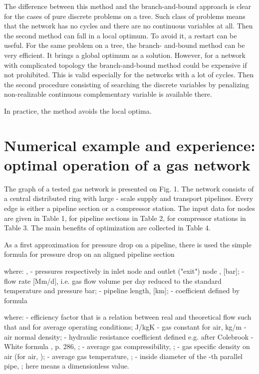 \documentclass{article}
\begin{document}
The difference between this method and the branch-and-bound approach is
clear for the cases of pure discrete problems on a tree. Such class of
problems means that the network has no cycles and there are no continuous
variables at all. Then the second method can fall in a local optimum. To
avoid it, a restart can be useful. For the same problem on a tree, the
branch- and-bound method can be very efficient. It brings a global optimum
as a solution. However, for a network with complicated topology the
branch-and-bound method could be expensive if not prohibited. This is valid
especially for the networks with a lot of cycles. Then the second procedure
consisting of searching the discrete variables  by penalizing
non-realizable continuous complementary variable  is available there.

In practice, the method avoids the local optima.

\section{Numerical example and experience: optimal operation of a gas network}

The graph of a tested gas network is presented on Fig. 1. The network
consists of a central distributed ring with large - scale supply and
transport pipelines. Every edge is either a pipeline section or a compressor
station. The input data for nodes are given in Table 1, for pipeline
sections in Table 2, for compressor stations in Table 3. The main benefits
of optimization are collected in Table 4.

As a first approximation for pressure drop on a pipeline, there is used the
simple formula for pressure drop on an aligned pipeline section

where:  ,  - pressures respectively in inlet node  and
outlet ("exit") node , [bar];  - flow rate [Mm/d], i.e. gas flow volume per day reduced to the standard temperature  and pressure  bar;  - pipeline length, [km];  -
coefficient defined by formula

where:  - efficiency factor that is a relation between real and
theoretical flow such that  and  for average operating
conditions;  J/kgK - gas constant for air,  kg/m
- air normal density;  - hydraulic resistance coefficient defined
e.g. after Colebrook - White formula \cite{11 Simone-88}, p. 286, ;  - average gas compressibility, ;  - gas
specific density on air (for air, );  - average gas
temperature, ;  - inside diameter of the -th parallel pipe, ; here  means a dimensionless value.
\end{document}
